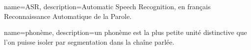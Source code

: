 {
	name=ASR,
	description={Automatic Speech Recognition, en français Reconnaissance Automatique de la Parole.}
}

{
	name=phonème,
	description={un phonème est la plus petite unité distinctive que l'on puisse isoler par segmentation dans la chaîne parlée.}
}


